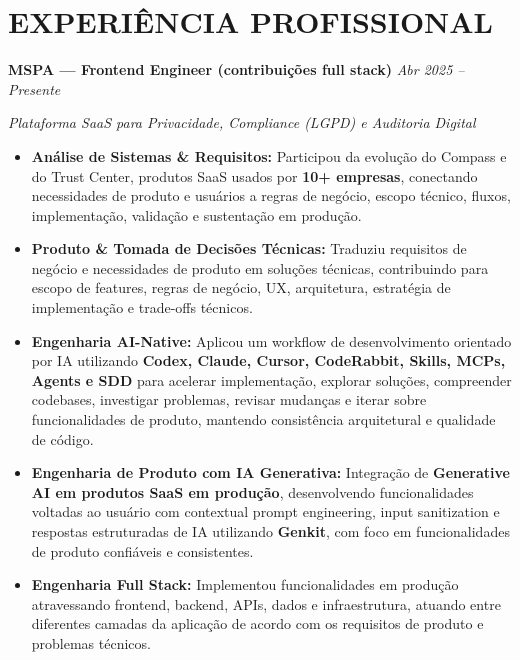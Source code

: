 \documentclass[10pt,a4paper]{article}
\begin{document}
\section*{EXPERIÊNCIA PROFISSIONAL}

\noindent
\textbf{MSPA — Frontend Engineer (contribuições full stack)}
\hfill
\textit{Abr 2025 -- Presente}

\textit{Plataforma SaaS para Privacidade, Compliance (LGPD) e Auditoria Digital}

\begin{itemize}

    \item
    \textbf{Análise de Sistemas \& Requisitos:}
    Participou da evolução do Compass e do Trust Center, produtos
    SaaS usados por \textbf{10+ empresas}, conectando necessidades
    de produto e usuários a regras de negócio, escopo técnico,
    fluxos, implementação, validação e sustentação em produção.

    \item
    \textbf{Produto \& Tomada de Decisões Técnicas:}
    Traduziu requisitos de negócio e necessidades de produto em
    soluções técnicas, contribuindo para escopo de features,
    regras de negócio, UX, arquitetura, estratégia de
    implementação e trade-offs técnicos.

    \item
    \textbf{Engenharia AI-Native:}
    Aplicou um workflow de desenvolvimento orientado por IA
    utilizando \textbf{Codex, Claude, Cursor, CodeRabbit, Skills,
    MCPs, Agents e SDD} para acelerar implementação, explorar
    soluções, compreender codebases, investigar problemas,
    revisar mudanças e iterar sobre funcionalidades de produto,
    mantendo consistência arquitetural e qualidade de código.

    \item
    \textbf{Engenharia de Produto com IA Generativa:}
    Integração de \textbf{Generative AI em produtos SaaS em
    produção}, desenvolvendo funcionalidades voltadas ao usuário
    com contextual prompt engineering, input sanitization e
    respostas estruturadas de IA utilizando \textbf{Genkit},
    com foco em funcionalidades de produto confiáveis e
    consistentes.

    \item
    \textbf{Engenharia Full Stack:}
    Implementou funcionalidades em produção atravessando
    frontend, backend, APIs, dados e infraestrutura, atuando
    entre diferentes camadas da aplicação de acordo com os
    requisitos de produto e problemas técnicos.


\end{itemize}
\end{document}
